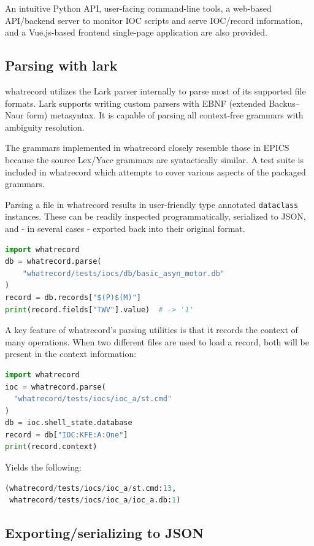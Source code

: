 \documentclass[letter,
               keeplastbox,   %
               ]{jacow}
\begin{document}
An intuitive Python API, user-facing command-line tools, a web-based
API/backend server to monitor IOC scripts and serve IOC/record information, and
a Vue.js-based frontend single-page application are also provided.

\subsection{Parsing with lark}

whatrecord utilizes the Lark\cite{lark} parser internally to parse most of its supported
file formats.  Lark supports writing custom parsers with EBNF (extended
Backus–Naur form) metasyntax.  It is capable of parsing all context-free
grammars with ambiguity resolution. 

The grammars implemented in whatrecord closely resemble those in EPICS because
the source Lex/Yacc grammars are syntactically similar.  A test suite is
included in whatrecord which attempts to cover various aspects of the packaged
grammars.

Parsing a file in whatrecord results in user-friendly type annotated
\verb_dataclass_ instances. These can be readily inspected programmatically,
serialized to JSON, and - in several cases - exported back into their original
format.

\begin{lstlisting}[language=python]
import whatrecord
db = whatrecord.parse(
    "whatrecord/tests/iocs/db/basic_asyn_motor.db"
)
record = db.records["$(P)$(M)"]
print(record.fields["TWV"].value)  # -> '1'
\end{lstlisting}

A key feature of whatrecord's parsing utilities is that it records the context
of many operations.  When two different files are used to load a record,
both will be present in the context information:

\begin{lstlisting}[language=python]
import whatrecord
ioc = whatrecord.parse(
  "whatrecord/tests/iocs/ioc_a/st.cmd"
)
db = ioc.shell_state.database
record = db["IOC:KFE:A:One"]
print(record.context)
\end{lstlisting}

Yields the following:
\begin{lstlisting}[language=python]
(whatrecord/tests/iocs/ioc_a/st.cmd:13,
 whatrecord/tests/iocs/ioc_a/ioc_a.db:1)
\end{lstlisting}

\subsection{Exporting/serializing to JSON}
\end{document}
